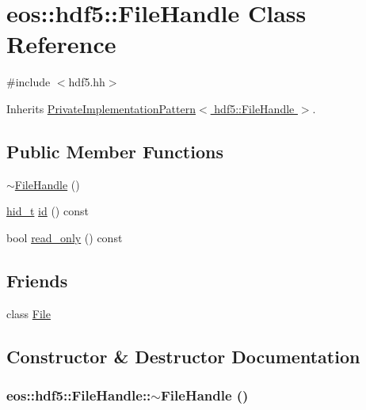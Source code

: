 \hypertarget{classeos_1_1hdf5_1_1FileHandle}{
\section{eos::hdf5::FileHandle Class Reference}
\label{classeos_1_1hdf5_1_1FileHandle}
}


{\ttfamily \#include $<$hdf5.hh$>$}

Inherits \hyperlink{classeos_1_1PrivateImplementationPattern}{PrivateImplementationPattern$<$ hdf5::FileHandle $>$}.\subsection*{Public Member Functions}
\begin{DoxyCompactItemize}
\item 
\hyperlink{classeos_1_1hdf5_1_1FileHandle_a493e129a4cc5cc14a5b28c66b83c0554}{$\sim$FileHandle} ()
\item 
\hyperlink{namespaceeos_1_1hdf5_a5bd5e209f1bf36cdc5551465dacf2e74}{hid\_\-t} \hyperlink{classeos_1_1hdf5_1_1FileHandle_ad82bab7945b094e0504e1956026481ae}{id} () const 
\item 
bool \hyperlink{classeos_1_1hdf5_1_1FileHandle_a48481c6740c14dc65b04561ad68edef6}{read\_\-only} () const 
\end{DoxyCompactItemize}
\subsection*{Friends}
\begin{DoxyCompactItemize}
\item 
class \hyperlink{classeos_1_1hdf5_1_1FileHandle_a68d15876ad188b7628261b12d0eac8aa}{File}
\end{DoxyCompactItemize}


\subsection{Constructor \& Destructor Documentation}
\hypertarget{classeos_1_1hdf5_1_1FileHandle_a493e129a4cc5cc14a5b28c66b83c0554}{
\subsubsection[{$\sim$FileHandle}]{\setlength{\rightskip}{0pt plus 5cm}eos::hdf5::FileHandle::$\sim$FileHandle ()}}
\label{classeos_1_1hdf5_1_1FileHandle_a493e129a4cc5cc14a5b28c66b83c0554}


